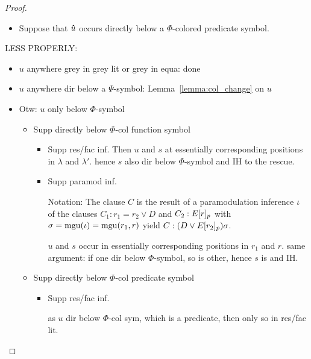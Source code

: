 \documentclass[,%
	draft=false,%
	numbers=noendperiod
	12pt,
	a4paper,
	oneside,%
	openany,
]{memoir}
\begin{document}
\begin{proof}
\begin{itemize}
\begin{itemize}
\begin{itemize}
\begin{itemize}
								\item
									Suppose that $\bm\hat u$ occurs directly below a $\Phi$-colored predicate symbol. 

							\end{itemize}
							\cbend


					\end{itemize}

			\end{itemize}

			{
				\color{gray}
				LESS PROPERLY:
				\tiny
				\begin{itemize}
					\item $u$ anywhere grey in grey lit or grey in equa: done
					\item $u$ anywhere dir below a $\Psi$-symbol: Lemma~\ref{lemma:col_change} on $u$ 
					\item Otw: $u$ only below $\Phi$-symbol

						\begin{itemize}
							\item Supp directly below $\Phi$-col function symbol

								\begin{itemize}
									\item Supp res/fac inf.
										Then $u$ and $s$ at essentially corresponding positions in $\lambda$ and $\lambda'$.
										hence $s$ also dir below $\Phi$-symbol and IH to the rescue.
									\item Supp paramod inf.

										Notation:
										The clause $C$ is the result of a paramodulation inference\nolinebreak{} $\iota$ of
										the clauses $C_1: r_1=r_2 \lor D$ and $C_2: E{[r]_{p}}$ with $\sigma=\operatorname{mgu}(\iota)=\operatorname{mgu}(r_1, r)$ yield $C: (D\lor E{[r_2]_{p}})\sigma$.

										$u$ and $s$ occur in essentially corresponding positions in $r_1$ and $r$.
										same argument: if one dir below $\Phi$-symbol, so is other, hence $s$ is and IH.

								\end{itemize}

							\item Supp directly below $\Phi$-col predicate symbol

								\begin{itemize}
									\item Supp res/fac inf.

										as $u$ dir below $\Phi$-col sym, which is a predicate, then only so in res/fac lit.


\end{itemize}
\end{itemize}
\end{itemize}}
\end{itemize}
\end{proof}
\end{document}
